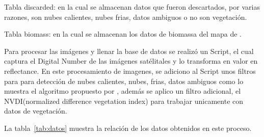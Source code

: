 Tabla discarded: en la cual se almacenan datos que fueron descartados, por varias razones,
son nubes calientes, nubes frias, datos ambiguos o no son vegetación.

Tabla biomass: en la cual se almacenan los datos de biomassa del mapa de \cite{baccini2008afirst}.

Para procesar las imágenes y llenar la base de datos se realizó un Script, el cual captura el Digital Number
de las imágenes satélitales y lo transforma en valor en reflectance. En este procesamiento de imagenes, se adiciono al Script unos filtros para para detección de nubes calientes,
nubes, frias, datos ambiguos como lo muestra el algoritmo propuesto por \cite{irish2000landsat}, además se aplico 
un filtro adicional, el NVDI(normalized difference vegetation index) para trabajar unicamente con datos de vegetación.

La tabla~\ref{tab:datos} muestra la relación de los datos obtenidos en este proceso.

\begin{table}
\caption{Datos obtenidos en en el proceso de procesamiento y limpieza  de datos}
\label{tab:datos}
\centering
{}
\end{table}

